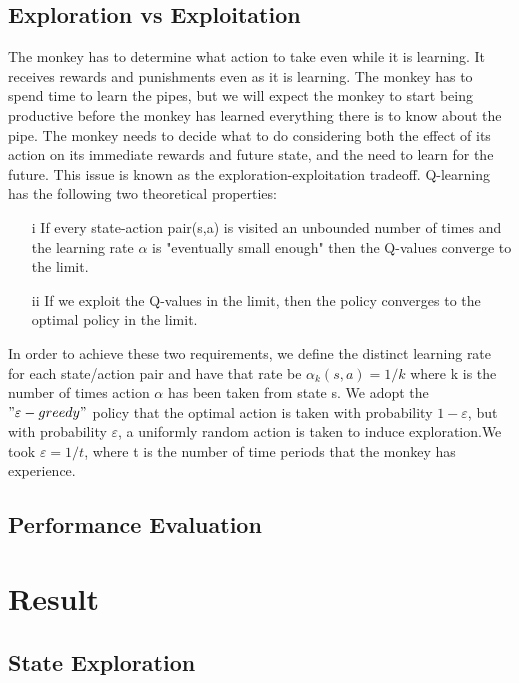 \documentclass[11pt]{article}
\theoremstyle{definition}
\begin{document}
{\color{red}
\subsection{\textbf{Exploration vs Exploitation}}
The monkey has to determine what action to take even while it is learning. It receives rewards and punishments even as it is learning. The monkey has to spend time to learn the pipes, but we will expect the monkey to start being productive before the monkey has learned everything there is to know about the pipe. The monkey needs to decide what to do considering both the effect of its action on its immediate rewards and future state, and the need to learn for the future. This issue is known as the exploration-exploitation tradeoff. Q-learning has the following two theoretical properties:
\begin{enumerate}
	\item [i] If every state-action pair(s,a) is visited an unbounded number of times and the learning rate $\alpha$ is "eventually small enough" then the Q-values converge to the limit.
	\item [ii] If we exploit the Q-values in the limit, then the policy converges to the optimal policy in the limit.
\end{enumerate}
In order to achieve these two requirements, we define the distinct learning rate for each state/action pair and have that rate be $\alpha_k(s,a)=1/k$ where k is the number of times action $\alpha$ has been taken from state s. We adopt the $"\varepsilon-greedy"$ policy that the optimal action is taken with probability $1-\varepsilon$, but with probability $\varepsilon$, a uniformly random action is taken to induce exploration.We took $\varepsilon=1/t$, where t is the number of time periods that the monkey has experience.
}



\subsection{\textbf{Performance Evaluation}}


\section{\textbf{Result}}

\subsection{\textbf{State Exploration}}
\end{document}
